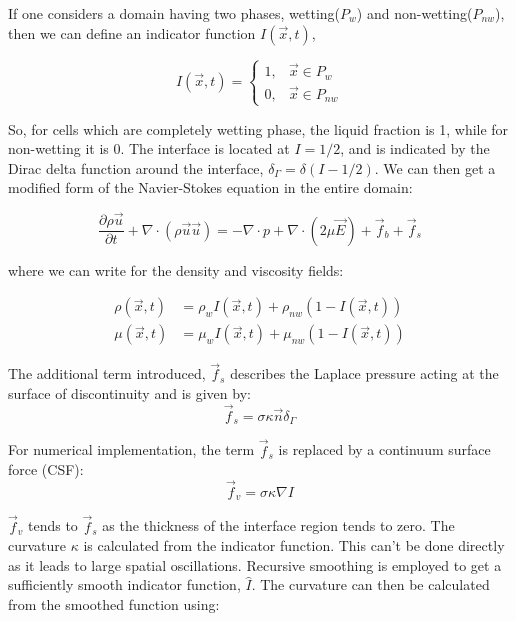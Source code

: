 If one considers a domain having two phases, wetting($P_{w}$) and non-wetting($P_{nw}$), then we can define an indicator function $I(\vec{x},t)$,

\[
I(\vec{x},t) = \left\{
	\begin{array}{lr}
		1,  &  \vec{x} \in  P_{w} \\
		0, & \vec{x} \in  P_{nw}
		\end{array}
		\right.	%
		\label{eq:indicator}
		\]

So, for cells which are completely wetting phase, the liquid fraction is 1, while for non-wetting it is 0. The interface is located at $I = 1/2$, and is indicated by the Dirac delta function around the interface, $\delta_{\Gamma} = \delta(I-1/2)$. We can then get a modified form of the Navier-Stokes equation in the entire domain:

\begin{equation}
\frac{\partial\rho\vec{u}}{\partial t}+\nabla\cdot(\rho\vec{u}\vec{u}) = -\nabla\cdot p + \nabla\cdot(2\mu\vec{E})+\vec{f}_b+\vec{f}_s
\label{eq:vof_navier_stokes}
\end{equation}

where we can write for the density and viscosity fields:

\begin{align*}
	\rho(\vec{x},t) & = \rho_w I(\vec{x},t) + \rho_{nw}(1-I(\vec{x},t))\\
	\mu(\vec{x},t) & = \mu_w I(\vec{x},t) + \mu_{nw} (1-I(\vec{x},t))
\end{align*}

The additional term introduced, $\vec{f}_s$ describes the Laplace pressure acting at the surface of discontinuity and is given by:
\begin{equation}
\vec{f}_s = \sigma\kappa\vec{n}\delta_{\Gamma}
\end{equation}

For numerical implementation, the term $\vec{f}_s$ is replaced by a continuum surface force (CSF):
\begin{equation}
\vec{f}_v = \sigma\kappa\nabla I
\end{equation}

$\vec{f}_v$ tends to $\vec{f}_s$ as the thickness of the interface region tends to zero. 
The curvature $\kappa$ is calculated from the indicator function. This can't be done directly as it leads to large spatial oscillations. Recursive smoothing is employed to get a sufficiently smooth indicator function, $\hat{I}$. The curvature can then be calculated from the smoothed function using:

